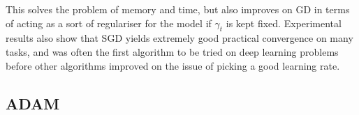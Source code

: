 This solves the problem of memory and time, but also improves on GD in terms of
acting as a sort of regulariser for the model if $\gamma_t$ is kept fixed.
Experimental results also show that SGD yields extremely good practical
convergence on many tasks, and was often the first algorithm to be tried on deep
learning problems before other algorithms improved on the issue of picking a
good learning rate.

\subsection{ADAM}

